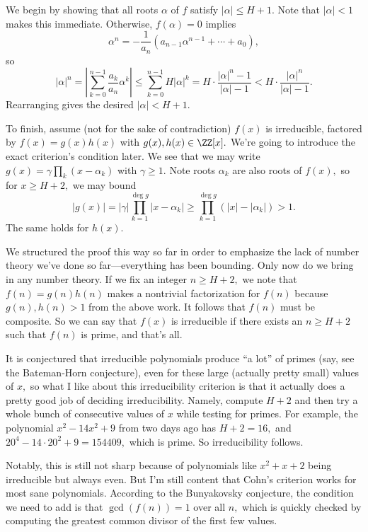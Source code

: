 We begin by showing that all roots $\alpha$ of $f$ satisfy $|\alpha|\le H+1.$ Note that $|\alpha|<1$ makes this immediate. Otherwise, $f(\alpha)=0$ implies
\[\alpha^n=-\frac1{a_n}\left(a_{n-1}\alpha^{n-1}+\cdots+a_0\right),\]
so
\[|\alpha|^n=\left|\sum_{k=0}^{n-1}\frac{a_k}{a_n}\alpha^k\right|\le\sum_{k=0}^{n-1}H|\alpha|^k=H\cdot\frac{|\alpha|^n-1}{|\alpha|-1}<H\cdot\frac{|\alpha|^n}{|\alpha|-1}.\]
Rearranging gives the desired $|\alpha|<H+1.$

To finish, assume (not for the sake of contradiction) $f(x)$ is irreducible, factored by $f(x)=g(x)h(x)$ with $g(x),h(x)\in\ZZ[x].$ We're going to introduce the exact criterion's condition later. We see that we may write $g(x)=\gamma\prod_k(x-\alpha_k)$ with $\gamma\ge1.$ Note roots $\alpha_k$ are also roots of $f(x),$ so for $x\ge H+2,$ we may bound
\[|g(x)|=|\gamma|\prod_{k=1}^{\deg g}|x-\alpha_k|\ge\prod_{k=1}^{\deg g}(|x|-|\alpha_k|)>1.\]
The same holds for $h(x).$

We structured the proof this way so far in order to emphasize the lack of number theory we've done so far---everything has been bounding. Only now do we bring in any number theory. If we fix an integer $n\ge H+2,$ we note that $f(n)=g(n)h(n)$ makes a nontrivial factorization for $f(n)$ because $g(n),h(n)>1$ from the above work. It follows that $f(n)$ must be composite. So we can say that $f(x)$ is irreducible if there exists an $n\ge H+2$ such that $f(n)$ is prime, and that's all.

It is conjectured that irreducible polynomials produce ``a lot'' of primes (say, see the Bateman-Horn conjecture), even for these large (actually pretty small) values of $x,$ so what I like about this irreducibility criterion is that it actually does a pretty good job of deciding irreducibility. Namely, compute $H+2$ and then try a whole bunch of consecutive values of $x$ while testing for primes. For example, the polynomial $x^2-14x^2+9$ from two days ago has $H+2=16,$ and $20^4-14\cdot20^2+9=154409,$ which is prime. So irreducibility follows.

Notably, this is still not sharp because of polynomials like $x^2+x+2$ being irreducible but always even. But I'm still content that Cohn's criterion works for most sane polynomials. According to the Bunyakovsky conjecture, the condition we need to add is that $\gcd(f(n))=1$ over all $n,$ which is quickly checked by computing the greatest common divisor of the first few values.

